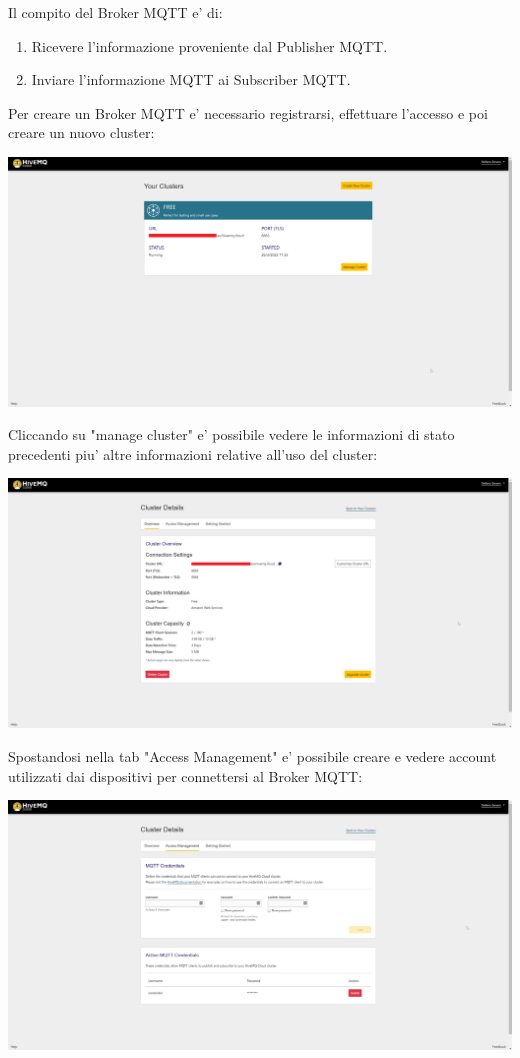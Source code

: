 \documentclass[a4paper]{article}
\begin{document}
Il compito del Broker MQTT e' di:
\begin{enumerate}
    \item Ricevere l'informazione proveniente dal Publisher MQTT.
    \item Inviare l'informazione MQTT ai Subscriber MQTT.
\end{enumerate}

Per creare un Broker MQTT e' necessario registrarsi, effettuare l'accesso e poi creare un nuovo cluster:

\includegraphics[width=\textwidth,height=\textheight,keepaspectratio]{assets/hivemq_clusters}


Cliccando su "manage cluster" e' possibile vedere le informazioni di stato precedenti piu' altre informazioni relative all'uso del cluster:

\includegraphics[width=\textwidth,height=\textheight,keepaspectratio]{assets/hivemq_clusterdetails}

Spostandosi nella tab "Access Management" e' possibile creare e vedere account utilizzati dai dispositivi per connettersi al Broker MQTT:

\includegraphics[width=\textwidth,height=\textheight,keepaspectratio]{assets/hivemq_access_management}
\end{document}
